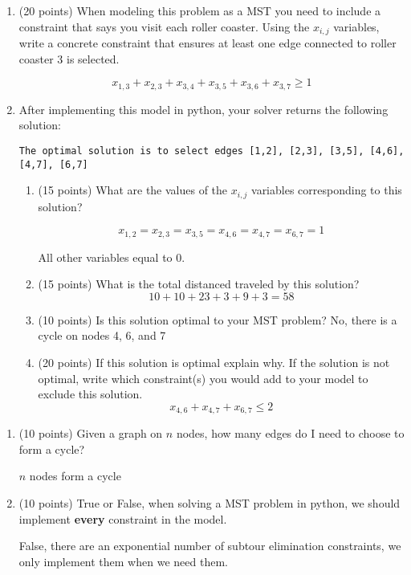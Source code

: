 \documentclass[letterpaper,oneside,12pt]{article}%
\newcommand{\blu}{\color{blue}}
\begin{document}
\begin{enumerate}
\item (20 points) When modeling this problem as a MST you need to include a constraint that says you visit each roller coaster. Using the $x_{i,j}$ variables, write a concrete constraint that ensures at least one edge connected to roller coaster 3 is selected.

{\blu
\[
x_{1,3} + x_{2,3} + x_{3,4} + x_{3,5} + x_{3,6} + x_{3,7} \geq 1
\]
}


\item After implementing this model in python, your solver returns the following solution:

	\verb|The optimal solution is to select edges [1,2], [2,3], [3,5], [4,6], [4,7], [6,7]|
		\begin{enumerate}
		\item (15 points) What are the values of the $x_{i,j}$ variables corresponding to this solution?
{\blu
		\[
		x_{1,2}=x_{2,3}=x_{3,5}=x_{4,6} = x_{4,7} = x_{6,7} = 1
		\]
		
		All other variables equal to 0.
}
		\item (15 points) What is the total distanced traveled by this solution?
		{\blu
		\[
		10+10+23+3+9+3 = 58
		\]
		}
		\newpage
		\item (10 points) Is this solution optimal to your MST problem?
		{
		\blu
		No, there is a cycle on nodes 4, 6, and 7
		}
		\item (20 points) If this solution is optimal explain why. If the solution is not optimal, write which constraint(s) you would add to your model to exclude this solution.
		{\blu
		\[
		x_{4,6} + x_{4,7}+ x_{6,7} \leq 2
		\]
		}
		\end{enumerate}
\end{enumerate}

\begin{enumerate}[resume]
\item (10 points) Given a graph on $n$ nodes, how many edges do I need to choose to form a cycle?

{
\blu $n$ nodes form a cycle
}
\item (10 points) True or False, when solving a MST problem in python, we should implement \textbf{every} constraint in the model.

{\blu
False, there are an exponential number of subtour elimination constraints, we only implement them when we need them.
}

\end{enumerate}
\end{document}
